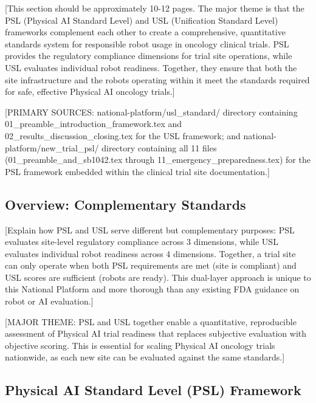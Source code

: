 
[This section should be approximately 10-12 pages. The major theme is that the
PSL (Physical AI Standard Level) and USL (Unification Standard Level) frameworks
complement each other to create a comprehensive, quantitative standards system
for responsible robot usage in oncology clinical trials. PSL provides the
regulatory compliance dimensions for trial site operations, while USL evaluates
individual robot readiness. Together, they ensure that both the site
infrastructure and the robots operating within it meet the standards required
for safe, effective Physical AI oncology trials.]

[PRIMARY SOURCES: national-platform/usl\_standard/ directory containing
01\_preamble\_introduction\_framework.tex and 02\_results\_discussion\_closing.tex
for the USL framework; and national-platform/new\_trial\_psl/ directory
containing all 11 files (01\_preamble\_and\_sb1042.tex through
11\_emergency\_preparedness.tex) for the PSL framework embedded within the
clinical trial site documentation.]

\subsection{Overview: Complementary Standards}
\label{subsec:standards-overview}

[Explain how PSL and USL serve different but complementary purposes:
PSL evaluates site-level regulatory compliance across 3 dimensions, while
USL evaluates individual robot readiness across 4 dimensions. Together, a
trial site can only operate when both PSL requirements are met (site is
compliant) and USL scores are sufficient (robots are ready). This dual-layer
approach is unique to this National Platform and more thorough than any
existing FDA guidance on robot or AI evaluation.]

[MAJOR THEME: PSL and USL together enable a quantitative, reproducible
assessment of Physical AI trial readiness that replaces subjective evaluation
with objective scoring. This is essential for scaling Physical AI oncology
trials nationwide, as each new site can be evaluated against the same
standards.]

\subsection{Physical AI Standard Level (PSL) Framework}
\label{subsec:psl-framework}

